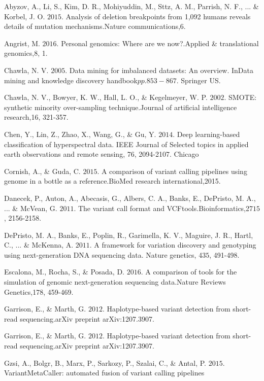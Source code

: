 \documentclass{article}
\begin{document}
\begin{list}{}{%
\setlength{\topsep}{0pt}%
\setlength{\leftmargin}{0.5in}%
\setlength{\listparindent}{-0.5in}%
\setlength{\itemindent}{-0.5in}%
\setlength{\parsep}{\parskip}%
}%
\item[]\item[] Abyzov, A., Li, S., Kim, D. R., Mohiyuddin, M., Sttz, A. M., Parrish, N. F., ... \& Korbel, J. O. \(2015\). Analysis of deletion breakpoints from 1,092 humans reveals details of mutation mechanisms.Nature communications,6.\\\item[] Angrist, M. \(2016\). Personal genomics: Where are we now?.Applied \& translational genomics,8, 1.\\\item[] Chawla, N. V. \(2005\). Data mining for imbalanced datasets: An overview. InData mining and knowledge discovery handbook\(pp. 853-867\). Springer US.\\\item[] Chawla, N. V., Bowyer, K. W., Hall, L. O., \& Kegelmeyer, W. P. \(2002\). SMOTE: synthetic minority over-sampling technique.Journal of artificial intelligence research,16, 321-357.\\\item[] Chen, Y., Lin, Z., Zhao, X., Wang, G., \& Gu, Y. \(2014\). Deep learning-based classification of hyperspectral data. IEEE Journal of Selected topics in applied earth observations and remote sensing, 7\(6\), 2094-2107. Chicago \\\item[] Cornish, A., \& Guda, C. \(2015\). A comparison of variant calling pipelines using genome in a bottle as a reference.BioMed research international,2015.\\\item[] Danecek, P., Auton, A., Abecasis, G., Albers, C. A., Banks, E., DePristo, M. A., ... \& McVean, G. \(2011\). The variant call format and VCFtools.Bioinformatics,27\(15\), 2156-2158.\\\item[] DePristo, M. A., Banks, E., Poplin, R., Garimella, K. V., Maguire, J. R., Hartl, C., ... \& McKenna, A. \(2011\). A framework for variation discovery and genotyping using next-generation DNA sequencing data. Nature genetics, 43\(5\), 491-498.\\\item[] Escalona, M., Rocha, S., \& Posada, D. \(2016\). A comparison of tools for the simulation of genomic next-generation sequencing data.Nature Reviews Genetics,17\(8\), 459-469.\\\item[] Garrison, E., \& Marth, G. \(2012\). Haplotype-based variant detection from short-read sequencing.arXiv preprint arXiv:1207.3907.\\\item[] Garrison, E., \& Marth, G. \(2012\). Haplotype-based variant detection from short-read sequencing.arXiv preprint arXiv:1207.3907.\\\item[] Gzsi, A., Bolgr, B., Marx, P., Sarkozy, P., Szalai, C., \& Antal, P. \(2015\). VariantMetaCaller: automated fusion of variant calling pipelines 
\end{list}
\end{document}
